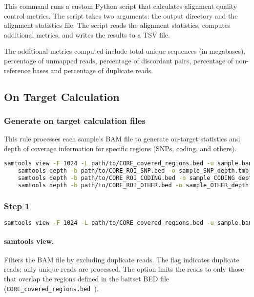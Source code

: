 This command runs a custom Python script that calculates alignment quality control metrics. The script takes two arguments: the output directory and the alignment statistics file. The script reads the alignment statistics, computes additional metrics, and writes the results to a TSV file.

The additional metrics computed include total unique sequences (in megabases), percentage of unmapped reads, percentage of discordant pairs, percentage of non-reference bases and percentage of duplicate reads.

\subsection{On Target Calculation}
\subsubsection{Generate on target calculation files}

This rule processes each sample's BAM file to generate on-target statistics and depth of coverage information for specific regions (SNPs, coding, and others).

\begin{lstlisting}[breaklines=true, language=bash]
    samtools view -F 1024 -L path/to/CORE_covered_regions.bed -u sample.bam | samtools stats > sample_onTarget_samtools_stats.txt;
    samtools depth -b path/to/CORE_ROI_SNP.bed -o sample_SNP_depth.tmp sample.bam; 
    samtools depth -b path/to/CORE_ROI_CODING.bed -o sample_CODING_depth.tmp sample.bam;
    samtools depth -b path/to/CORE_ROI_OTHER.bed -o sample_OTHER_depth.tmp sample.bam;
\end{lstlisting}

\subsubsection*{Step 1}

\begin{lstlisting}[breaklines=true, language=bash]
    samtools view -F 1024 -L path/to/CORE_covered_regions.bed -u sample.bam | samtools stats > sample_onTarget_samtools_stats.txt;
\end{lstlisting}

\paragraph*{samtools view.} Filters the BAM file by excluding duplicate reads. The flag  indicates duplicate reads; only unique reads are processed. The  option lmits the reads to only those that overlap the regions defined in the baitset BED file (\texttt{CORE\_covered\_regions.bed }). 

